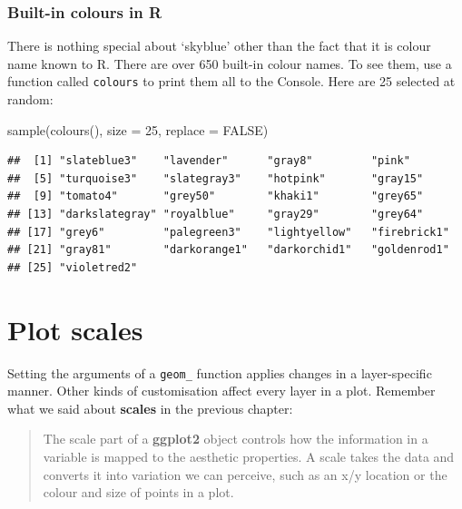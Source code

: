 \documentclass[
]{book}
\newenvironment{Shaded}{\begin{snugshade}}{\end{snugshade}}
\newcommand{\AttributeTok}[1]{\textcolor[rgb]{0.77,0.63,0.00}{#1}}
\newcommand{\ConstantTok}[1]{\textcolor[rgb]{0.00,0.00,0.00}{#1}}
\newcommand{\DecValTok}[1]{\textcolor[rgb]{0.00,0.00,0.81}{#1}}
\newcommand{\FunctionTok}[1]{\textcolor[rgb]{0.00,0.00,0.00}{#1}}
\newcommand{\NormalTok}[1]{#1}
\newenvironment{greybox}{
  \definecolor{shadecolor}{rgb}{0.95,0.95,0.95}  %
  \color{black}
  \begin{shaded}}
 {\end{shaded}}
\newenvironment{infobox}[1]
  {
  \begin{itemize}
  \renewcommand{\labelitemi}{
    \raisebox{-.7\height}[0pt][0pt]{
      {\setkeys{Gin}{width=3em,keepaspectratio}
        \texttt{[image: images/\#1]}}
    }
  }
  \setlength{\fboxsep}{1em}
  \begin{greybox}
  \item
  }
  {
  \end{greybox}
  \end{itemize}
  }
\begin{document}
\begin{infobox}{information}

\hypertarget{built-in-colours-in-r}{%
\subsubsection*{Built-in colours in R}\label{built-in-colours-in-r}}

There is nothing special about `skyblue' other than the fact that it is colour name known to R. There are over 650 built-in colour names. To see them, use a function called \texttt{colours} to print them all to the Console. Here are 25 selected at random:

\begin{Shaded}
\begin{Highlighting}[]
\FunctionTok{sample}\NormalTok{(}\FunctionTok{colours}\NormalTok{(), }\AttributeTok{size =} \DecValTok{25}\NormalTok{, }\AttributeTok{replace =} \ConstantTok{FALSE}\NormalTok{)}
\end{Highlighting}
\end{Shaded}

\begin{verbatim}
##  [1] "slateblue3"    "lavender"      "gray8"         "pink"         
##  [5] "turquoise3"    "slategray3"    "hotpink"       "gray15"       
##  [9] "tomato4"       "grey50"        "khaki1"        "grey65"       
## [13] "darkslategray" "royalblue"     "gray29"        "grey64"       
## [17] "grey6"         "palegreen3"    "lightyellow"   "firebrick1"   
## [21] "gray81"        "darkorange1"   "darkorchid1"   "goldenrod1"   
## [25] "violetred2"
\end{verbatim}

\end{infobox}

\hypertarget{plot-scales}{%
\section{Plot scales}\label{plot-scales}}

Setting the arguments of a \texttt{geom\_} function applies changes in a layer-specific manner. Other kinds of customisation affect every layer in a plot. Remember what we said about \textbf{scales} in the previous chapter:

\begin{quote}
The scale part of a \textbf{ggplot2} object controls how the information in a variable is mapped to the aesthetic properties. A scale takes the data and converts it into variation we can perceive, such as an x/y location or the colour and size of points in a plot.
\end{quote}
\end{document}
